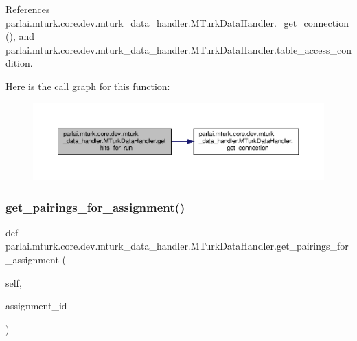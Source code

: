 References parlai.\+mturk.\+core.\+dev.\+mturk\+\_\+data\+\_\+handler.\+M\+Turk\+Data\+Handler.\+\_\+get\+\_\+connection(), and parlai.\+mturk.\+core.\+dev.\+mturk\+\_\+data\+\_\+handler.\+M\+Turk\+Data\+Handler.\+table\+\_\+access\+\_\+condition.

Here is the call graph for this function\+:
\nopagebreak
\begin{figure}[H]
\begin{center}
\leavevmode
\includegraphics[width=350pt]{classparlai_1_1mturk_1_1core_1_1dev_1_1mturk__data__handler_1_1MTurkDataHandler_a9effb9b4fadb19804787129f064f23a2_cgraph}
\end{center}
\end{figure}
\mbox{\label{classparlai_1_1mturk_1_1core_1_1dev_1_1mturk__data__handler_1_1MTurkDataHandler_a112a75abc2ccd02aa53119c88d1c6bb2}} 
\subsubsection{\texorpdfstring{get\+\_\+pairings\+\_\+for\+\_\+assignment()}{get\_pairings\_for\_assignment()}}
{\footnotesize\ttfamily def parlai.\+mturk.\+core.\+dev.\+mturk\+\_\+data\+\_\+handler.\+M\+Turk\+Data\+Handler.\+get\+\_\+pairings\+\_\+for\+\_\+assignment (\begin{DoxyParamCaption}\item[{}]{self,  }\item[{}]{assignment\+\_\+id }\end{DoxyParamCaption})}

